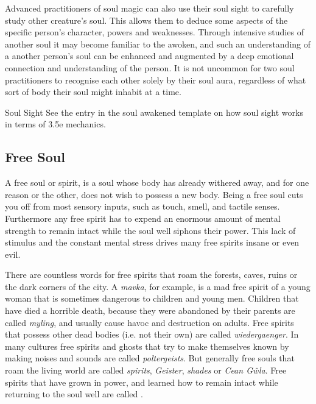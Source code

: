 Advanced practitioners of soul magic can also use their soul sight to
carefully study other creature's soul. This allows them to deduce some aspects
of the specific person's character, powers and weaknesses. Through intensive
studies of another soul it may become familiar to the awoken, and such an
understanding of a another person's soul can be enhanced and augmented by a
deep emotional connection and understanding of the person. It is not uncommon
for two soul practitioners to recognise each other solely by their soul aura,
regardless of what sort of body their soul might inhabit at a time.


\begin{35e}{Soul Sight}
  See the entry in the soul awakened template on how soul sight works in terms
  of 3.5e mechanics.
\end{35e}

\subsection{Free Soul}
\label{sec:Free Soul}

A free soul or spirit, is a soul whose body has already withered away, and for
one reason or the other, does not wish to possess a new body. Being a free
soul cuts you off from most sensory inputs, such as touch, smell, and tactile
senses. Furthermore any free spirit has to expend an enormous amount of mental
strength to remain intact while the soul well siphons their power. This lack
of stimulus and the constant mental stress drives many free spirits insane or
even evil.

There are countless words for free spirits that roam the forests, caves, ruins
or the dark corners of the city. A \emph{mavka}, for example, is a mad free
spirit of a young woman that is sometimes dangerous to children and young men.
Children that have died a horrible death, because they were abandoned by their
parents are called \emph{myling}, and usually cause havoc and destruction on
adults. Free spirits that possess other dead bodies (i.e. not their own) are
called \emph{wiedergaenger}. In many cultures free spirits and ghosts that try
to make themselves known by making noises and sounds are called
\emph{poltergeists}. But generally free souls that roam the living world are
called \emph{spirits}, \emph{Geister}, \emph{shades} or \emph{Cean Gŵla}. Free
spirits that have grown in power, and learned how to remain intact while
returning to the soul well are called .

